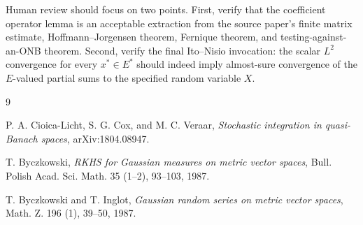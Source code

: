 \documentclass[11pt]{article}
\begin{document}
Human review should focus on two points. First, verify that the coefficient
operator lemma is an acceptable extraction from the source paper's finite
matrix estimate, Hoffmann--Jorgensen theorem, Fernique theorem, and
testing-against-an-ONB theorem. Second, verify the final Ito--Nisio invocation:
the scalar \(L^2\) convergence for every \(x^*\in E^*\) should indeed imply
almost-sure convergence of the \(E\)-valued partial sums to the specified
random variable \(X\).

\begin{thebibliography}{9}

P. A. Cioica-Licht, S. G. Cox, and M. C. Veraar,
\emph{Stochastic integration in quasi-Banach spaces},
arXiv:1804.08947.

T. Byczkowski,
\emph{RKHS for Gaussian measures on metric vector spaces},
Bull. Polish Acad. Sci. Math. 35 (1--2), 93--103, 1987.

T. Byczkowski and T. Inglot,
\emph{Gaussian random series on metric vector spaces},
Math. Z. 196 (1), 39--50, 1987.

\end{thebibliography}
\end{document}
